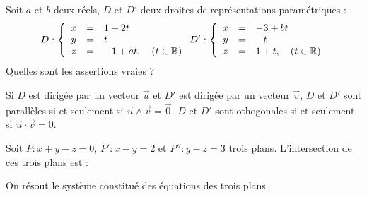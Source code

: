 \begin{question}

Soit $a$ et $b$ deux réels, $D$ et $D'$ deux droites de représentations paramétriques :
 $$D: \left\{\begin{array}{ccl}x&=&1+2t\\y&=&t\\ z&=&-1+at,\quad (t\in \mathbb{R}) \end{array}\right. D': \left\{\begin{array}{ccl}x&=&-3+bt\\y&=&-t\\ z&=&1+t,\quad (t\in \mathbb{R}) \end{array}\right. 
 $$ Quelles sont les assertions vraies ?
\begin{answers}



   
\end{answers}
\begin{explanations}
Si $D$ est dirigée par un vecteur $\vec{u}$ et $D'$ est dirigée par un vecteur $\vec{v}$, $D$ et $D'$ sont parallèles si et seulement si $\vec{u} \wedge \vec{v} = \overrightarrow 0$. $D$ et $D'$ sont othogonales si et seulement si $\vec{u} \cdot  \vec{v}=0$.
\end{explanations}

\end{question}


\begin{question}

Soit $P : x+y-z=0$,  $P' : x-y=2$ et $P'' : y-z=3$ trois plans. L'intersection de ces trois plans est : 
\begin{answers}


 
    
   
\end{answers}
\begin{explanations}
On résout le système constitué des équations des trois plans.
\end{explanations}

\end{question}


